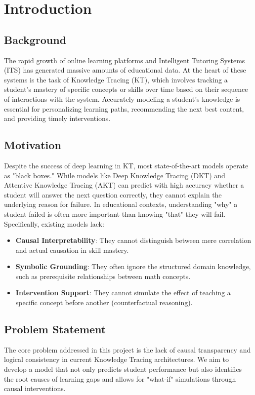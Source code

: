 \chapter{Introduction}

\section{Background}
The rapid growth of online learning platforms and Intelligent Tutoring Systems (ITS) has generated massive amounts of educational data. At the heart of these systems is the task of Knowledge Tracing (KT), which involves tracking a student's mastery of specific concepts or skills over time based on their sequence of interactions with the system. Accurately modeling a student's knowledge is essential for personalizing learning paths, recommending the next best content, and providing timely interventions.

\section{Motivation}
Despite the success of deep learning in KT, most state-of-the-art models operate as "black boxes." While models like Deep Knowledge Tracing (DKT) and Attentive Knowledge Tracing (AKT) can predict with high accuracy whether a student will answer the next question correctly, they cannot explain the underlying reason for failure. In educational contexts, understanding "why" a student failed is often more important than knowing "that" they will fail. Specifically, existing models lack:
\begin{itemize}
    \item \textbf{Causal Interpretability}: They cannot distinguish between mere correlation and actual causation in skill mastery.
    \item \textbf{Symbolic Grounding}: They often ignore the structured domain knowledge, such as prerequisite relationships between math concepts.
    \item \textbf{Intervention Support}: They cannot simulate the effect of teaching a specific concept before another (counterfactual reasoning).
\end{itemize}

\section{Problem Statement}
The core problem addressed in this project is the lack of causal transparency and logical consistency in current Knowledge Tracing architectures. We aim to develop a model that not only predicts student performance but also identifies the root causes of learning gaps and allows for "what-if" simulations through causal interventions.

